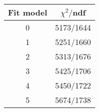 \begin{tabular}{c|c}
Fit model & $\chi^2/$ndf \\
\hline
0 & 5173/1644\\
1 & 5251/1660\\
2 & 5313/1676\\
3 & 5425/1706\\
4 & 5450/1722\\
5 & 5674/1738\\
\end{tabular}
